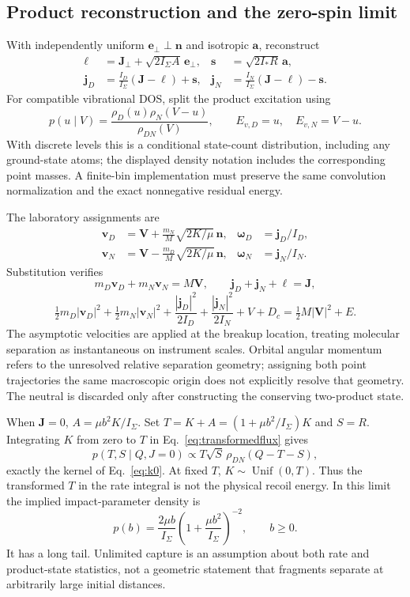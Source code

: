\documentclass[10pt,a4paper]{article}
\newcommand{\Unif}{\operatorname{Unif}}
\begin{document}
\clearpage
\subsection{Product reconstruction and the zero-spin limit}
With independently uniform $\mathbf e_\perp\perp\mathbf n$ and isotropic
$\mathbf a$, reconstruct
\begin{align}
 \boldsymbol\ell&=\mathbf J_\perp+\sqrt{2I_\Sigma A}\,\mathbf e_\perp,&
 \mathbf s&=\sqrt{2I_*R}\,\mathbf a,\\
 \mathbf j_D&=\frac{I_D}{I_\Sigma}(\mathbf J-\boldsymbol\ell)+\mathbf s,&
 \mathbf j_N&=\frac{I_N}{I_\Sigma}(\mathbf J-\boldsymbol\ell)-\mathbf s.
\end{align}
For compatible vibrational DOS, split the product excitation using
\begin{equation}
 p(u\mid V)=\frac{\rho_D(u)\rho_N(V-u)}{\rho_{DN}(V)},\qquad
 E_{v,D}=u,\quad E_{v,N}=V-u.
\end{equation}
With discrete levels this is a conditional state-count distribution, including
any ground-state atoms; the displayed density notation includes the
corresponding point masses. A finite-bin implementation must preserve the
same convolution normalization and the exact nonnegative residual energy.

The laboratory assignments are
\begin{align}
 \mathbf v_D&=\mathbf V+\frac{m_N}{M}\sqrt{2K/\mu}\,\mathbf n,&
 \boldsymbol\omega_D&=\mathbf j_D/I_D,\\
 \mathbf v_N&=\mathbf V-\frac{m_D}{M}\sqrt{2K/\mu}\,\mathbf n,&
 \boldsymbol\omega_N&=\mathbf j_N/I_N.
\end{align}
Substitution verifies
\[
 m_D\mathbf v_D+m_N\mathbf v_N=M\mathbf V,\qquad
 \mathbf j_D+\mathbf j_N+\boldsymbol\ell=\mathbf J,
\]
\[
 \tfrac12m_D|\mathbf v_D|^2+\tfrac12m_N|\mathbf v_N|^2
 +\frac{|\mathbf j_D|^2}{2I_D}+\frac{|\mathbf j_N|^2}{2I_N}+V+D_c
 =\tfrac12M|\mathbf V|^2+E.
\]
The asymptotic velocities are applied at the breakup location, treating
molecular separation as instantaneous on instrument scales. Orbital angular
momentum refers to the unresolved relative separation geometry; assigning
both point trajectories the same macroscopic origin does not explicitly
resolve that geometry. The neutral is discarded only after constructing the
conserving two-product state.

When $\mathbf J=0$,
$A=\mu b^2K/I_\Sigma$. Set
$T=K+A=(1+\mu b^2/I_\Sigma)K$ and $S=R$. Integrating $K$ from zero to $T$
in Eq.~\eqref{eq:transformedflux} gives
\[
 p(T,S\mid Q,J=0)\propto T\sqrt S\,\rho_{DN}(Q-T-S),
\]
exactly the kernel of Eq.~\eqref{eq:k0}. At fixed $T$,
$K\sim\Unif(0,T)$. Thus the transformed $T$ in the rate integral is not the
physical recoil energy. In this limit the implied impact-parameter density is
\[
 p(b)=\frac{2\mu b}{I_\Sigma}
 \left(1+\frac{\mu b^2}{I_\Sigma}\right)^{-2},\qquad b\geq0.
\]
It has a long tail. Unlimited capture is an assumption about both rate and
product-state statistics, not a geometric statement that fragments separate
at arbitrarily large initial distances.
\end{document}

